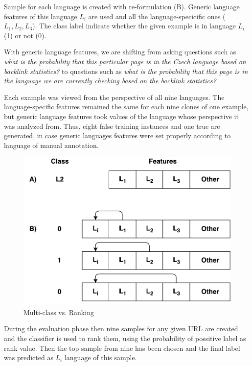 \documentclass{acm_proc_article-sp}
\begin{document}
  Sample for each language is created with re-formulation (B).
  Generic language features of this language $L_i$ are used and all the language-specicific
  ones ($L_1, L_2, L_3$). The class label indicate whether the given example is in language $L_i$ (1) or not (0).


  With generic language features, we are shifting from asking questions such as \textit{what is the probability that 
    this particular page is in the Czech language based on backlink statistics?} to questions 
    such as \textit{what is the probability that this page is in the language we are currently checking 
    based on the backlink statistics?} 
 
 Each example was viewed from the perspective of all nine languages. The 
  language-specific features remained the same for each nine clones of one example,
  but generic language features took values of the language whose perspective
  it was analyzed from.  Thus, eight false training instances and 
  one true are generated, in case generic languages features were set properly according to 
  language of manual annotation.

  \begin{figure}
      \caption{Multi-class vs. Ranking} 
     \label{examples} 
 
 \vspace{0.5cm}
      \centering
      \includegraphics[scale=0.5]{multiclass.pdf}
 \end{figure}

  During the evaluation phase then nine samples for any given URL are created
  and the classifier is used to rank them, using the probability of possitive label as rank value.
  Then the top sample from nine has been chosen and the final label was predicted as $L_i$ language of this sample.
\end{document}
